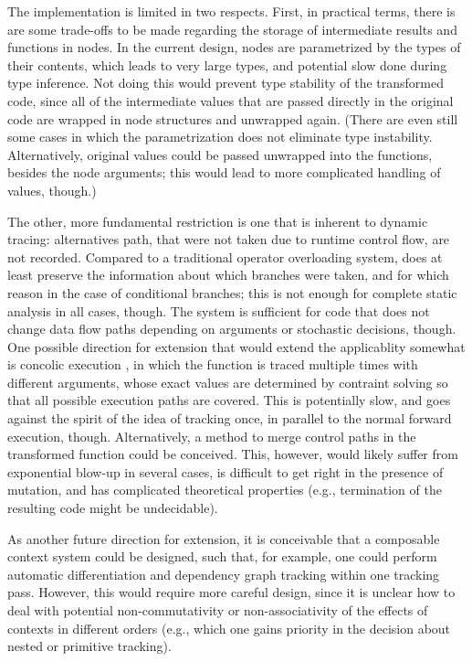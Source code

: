 The implementation is limited in two respects.  First, in practical terms, there is are some
trade-offs to be made regarding the storage of intermediate results and functions in nodes.  In the
current design, nodes are parametrized by the types of their contents, which leads to very large
types, and potential slow done during type inference.  Not doing this would prevent type stability
of the transformed code, since all of the intermediate values that are passed directly in the
original code are wrapped in node structures and unwrapped again.  (There are even still some cases
in which the parametrization does not eliminate type instability.  Alternatively, original values
could be passed unwrapped into the  functions, besides the node arguments; this
would lead to more complicated handling of values, though.)

The other, more fundamental restriction is one that is inherent to dynamic tracing: alternatives
path, that were not taken due to runtime control flow, are not recorded.  Compared to a traditional
operator overloading system, \irtrackerjl{} does at least preserve the information about which
branches were taken, and for which reason in the case of conditional branches; this is not enough
for complete static analysis in all cases, though.  The system is sufficient for code that does not
change data flow paths depending on arguments or stochastic decisions, though.  One possible
direction for extension that would extend the applicablity somewhat is concolic execution
\parencite{zeller2019concolic}, in which the function is traced multiple times with different
arguments, whose exact values are determined by contraint solving so that all possible execution
paths are covered.  This is potentially slow, and goes against the spirit of the idea of tracking
once, in parallel to the normal forward execution, though.  Alternatively, a method to merge control
paths in the transformed function could be conceived.  This, however, would likely suffer from
exponential blow-up in several cases, is difficult to get right in the presence of mutation, and has
complicated theoretical properties (e.g., termination of the resulting code might be undecidable).

As another future direction for extension, it is conceivable that a composable context system could
be designed, such that, for example, one could perform automatic differentiation and dependency
graph tracking within one tracking pass.  However, this would require more careful design, since it
is unclear how to deal with potential non-commutativity or non-associativity of the effects of
contexts in different orders (e.g., which one gains priority in the decision about nested or
primitive tracking).


